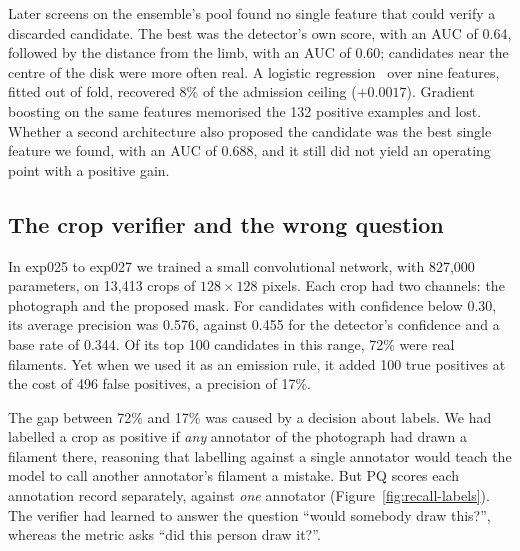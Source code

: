 Later screens on the ensemble's pool found no single feature that could verify a discarded
candidate. The best was the detector's own score, with an AUC of 0.64, followed by the distance from
the limb, with an AUC of 0.60; candidates near the centre of the disk were more often real. A logistic
regression~\citep{murphy} over nine features, fitted out of fold, recovered 8\% of the admission ceiling
($+0.0017$). Gradient boosting on the same features memorised the 132 positive examples and lost.
Whether a second architecture also proposed the candidate was the best single feature we found, with
an AUC of 0.688, and it still did not yield an operating point with a positive gain.

\subsection{The crop verifier and the wrong question}\label{sec:recall-crop}
In exp025 to exp027 we trained a small convolutional network, with 827,000 parameters, on 13,413 crops
of $128\times128$ pixels. Each crop had two channels: the photograph and the proposed mask. For
candidates with confidence below 0.30, its average precision was 0.576, against 0.455 for the
detector's confidence and a base rate of 0.344. Of its top 100 candidates in this range, 72\% were
real filaments. Yet when we used it as an emission rule, it added 100 true positives at the cost of
496 false positives, a precision of 17\%.

The gap between 72\% and 17\% was caused by a decision about labels. We had labelled a crop as
positive if \emph{any} annotator of the photograph had drawn a filament there, reasoning that
labelling against a single annotator would teach the model to call another annotator's filament a
mistake. But PQ scores each annotation record separately, against \emph{one} annotator
(Figure~\ref{fig:recall-labels}). The verifier had learned to answer the question ``would somebody
draw this?'', whereas the metric asks ``did this person draw it?''.

